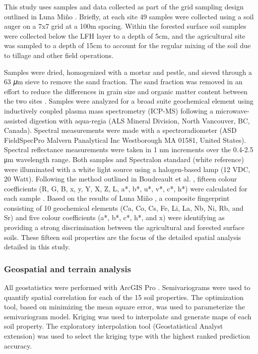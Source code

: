 \documentclass[
  number]{elsarticle}
\begin{document}
This study uses samples and data collected as part of the grid sampling
design outlined in Luna Miño \citep{lunamiño2024}. Briefly, at each site
49 samples were collected using a soil auger on a 7x7 grid at a 100m
spacing. Within the forested surface soil samples were collected below
the LFH layer to a depth of 5cm, and the agricultural site was sampled
to a depth of 15cm to account for the regular mixing of the soil due to
tillage and other field operations.

Samples were dried, homogenized with a mortar and pestle, and sieved
through a 63 𝜇m sieve to remove the sand fraction. The sand fraction was
removed in an effort to reduce the differences in grain size and organic
matter content between the two sites \citep{laceby2017}. Samples were
analyzed for a broad suite geochemical element using inductively coupled
plasma mass spectrometry (ICP-MS) following a microwave-assisted
digestion with aqua-regia (ALS Mineral Division, North Vancouver, BC,
Canada). Spectral measurements were made with a spectroradiometer (ASD
FieldSpecPro Malvern Panalytical Inc Westborough MA 01581, United
States). Spectral reflectance measurements were taken in 1 nm increments
over the 0.4-2.5 μm wavelength range. Both samples and Spectralon
standard (white reference) were illuminated with a white light source
using a halogen-based lamp (12 VDC, 20 Watt). Following the method
outlined in Boudreault et al. \citep{boudreault2018}, fifteen colour
coefficients (R, G, B, x, y, Y, X, Z, L, a*, b*, u*, v*, c*, h*) were
calculated for each sample \citep{koiter2021}. Based on the results of
Luna Miño \citep{lunamiño2024}, a composite fingerprint consisting of 10
geochemical elements (Ca, Co, Cs, Fe, Li, La, Nb, Ni, Rb, and Sr) and
five colour coefficients (a*, b*, c*, h*, and x) were identifying as
providing a strong discrimination between the agricultural and forested
surface soils. These fifteen soil properties are the focus of the
detailed spatial analysis detailed in this study.

\subsubsection{Geospatial and terrain
analysis}\label{geospatial-and-terrain-analysis}

All geostatistics were performed with ArcGIS Pro \citep[v
3.3.0][]{esri2024}. Semivariograms were used to quantify spatial
correlation for each of the 15 soil properties. The optimization tool,
based on minimizing the mean square error, was used to parameterize the
semivariogram model. Kriging was used to interpolate and generate maps
of each soil property. The exploratory interpolation tool
(Geostatistical Analyst extension) was used to select the kriging type
with the highest ranked prediction accuracy.
\end{document}
